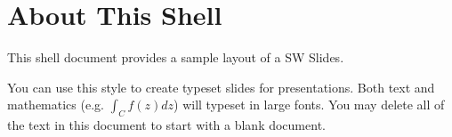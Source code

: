 \documentclass[12pt]{article}
\begin{document}
\section{About This Shell}

This shell document provides a sample layout of a SW Slides.

You can use this style to create typeset slides for presentations. Both text
and mathematics (e.g. $\int_{C}f\left( z\right) dz$) will typeset in large
fonts. You may delete all of the text in this document to start with a blank
document.
\end{document}

